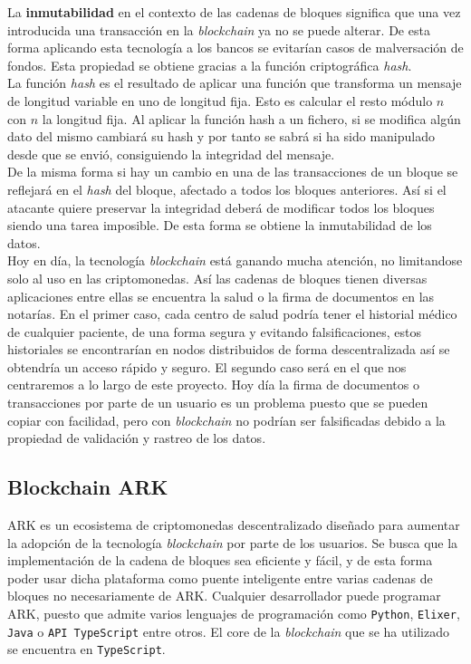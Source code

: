 La \textbf{inmutabilidad} en el contexto de las cadenas de bloques significa que una vez introducida una transacción en la \textit{blockchain} ya no se puede alterar. De esta forma aplicando esta tecnología a los bancos se evitarían casos de malversación de fondos. Esta propiedad se obtiene gracias a la función criptográfica \textit{hash}.\\

La función \textit{hash} es el resultado de aplicar una función que transforma un mensaje de longitud variable en uno de longitud fija. Esto es calcular el resto módulo $n$ con $n$ la longitud fija. Al aplicar la función hash a un fichero, si se modifica algún dato del mismo cambiará su hash y por tanto se sabrá si ha sido manipulado desde que se envió, consiguiendo la integridad del mensaje.\\

De la misma forma si hay un cambio en una de las transacciones de un bloque se reflejará en el \textit{hash} del bloque, afectado a todos los bloques anteriores. Así si el atacante quiere preservar la integridad deberá de modificar todos los bloques siendo una tarea imposible. De esta forma se obtiene la inmutabilidad de los datos.\\

Hoy en día, la tecnología \textit{blockchain} está ganando mucha atención, no limitandose solo al uso en las criptomonedas. Así las cadenas de bloques tienen diversas aplicaciones entre ellas se encuentra la salud o la firma de documentos en las notarías. En el primer caso, cada centro  de salud podría tener el historial médico de cualquier paciente, de una forma segura y evitando falsificaciones, estos historiales se encontrarían en nodos distribuidos de forma descentralizada así se obtendría un acceso rápido y seguro. El segundo caso será en el que nos centraremos a lo largo de este proyecto. Hoy día la firma de documentos o transacciones por parte de un usuario es un problema puesto que se pueden copiar con facilidad, pero con \textit{blockchain} no podrían ser falsificadas debido a la propiedad de validación y rastreo de los datos.\\

\subsection{Blockchain ARK}

ARK es un ecosistema de criptomonedas descentralizado diseñado para aumentar la adopción de la tecnología \textit{blockchain} por parte de los usuarios. Se busca que la implementación de la cadena de bloques sea eficiente y fácil, y de esta forma poder usar dicha plataforma como puente inteligente entre varias cadenas de bloques no necesariamente de ARK. Cualquier desarrollador puede programar ARK, puesto que admite varios lenguajes de programación como \texttt{Python}, \texttt{Elixer}, \texttt{Java} o \texttt{API TypeScript} entre otros. El core de la \textit{blockchain} que se ha utilizado se encuentra en \texttt{TypeScript}.\\

